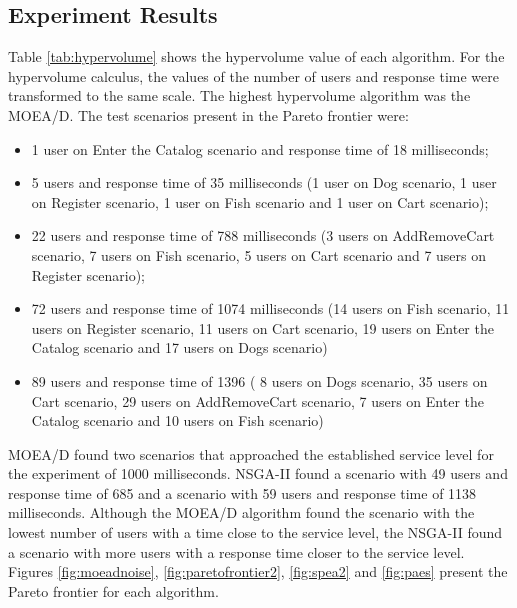 \documentclass[espaco=umemeio,chapter=TITLE,twoside,openright]{abnt}
\begin{document}
\subsection{Experiment Results}

Table \ref{tab:hypervolume} shows the hypervolume value of each algorithm. For the hypervolume calculus, the values of the number of users and response time were transformed to the same scale. The highest hypervolume algorithm was the MOEA/D. The test scenarios present in the Pareto frontier were:

\begin{itemize}
\item 1 user on Enter the Catalog scenario and response time of 18 milliseconds;
\item 5 users and response time of 35 milliseconds (1 user on Dog scenario, 1 user on Register scenario, 1 user on Fish scenario and 1 user on Cart scenario);
\item 22 users and response time of 788 milliseconds (3 users on AddRemoveCart scenario, 7 users on Fish scenario, 5 users on Cart scenario and 7 users on Register scenario);
\item 72 users and response time of 1074 milliseconds (14 users on Fish scenario, 11 users on Register scenario, 11 users on Cart scenario, 19 users on Enter the Catalog scenario and 17 users on Dogs scenario)
\item 89 users and response time of 1396 ( 8 users on Dogs scenario, 35 users on Cart scenario, 29 users on AddRemoveCart scenario, 7 users on Enter the Catalog scenario and 10 users on Fish scenario)

\end{itemize}

MOEA/D found two scenarios that approached the established service level for the experiment of 1000 milliseconds. NSGA-II  found a scenario with 49 users and response time of 685 and a scenario with 59 users and response time of 1138 milliseconds. Although the MOEA/D algorithm found the scenario with the lowest number of users with a time close to the service level, the NSGA-II found a scenario with more users with a response time closer to the service level. Figures \ref{fig:moeadnoise}, \ref{fig:paretofrontier2}, \ref{fig:spea2} and  \ref{fig:paes} present the Pareto frontier for each algorithm.
\end{document}
